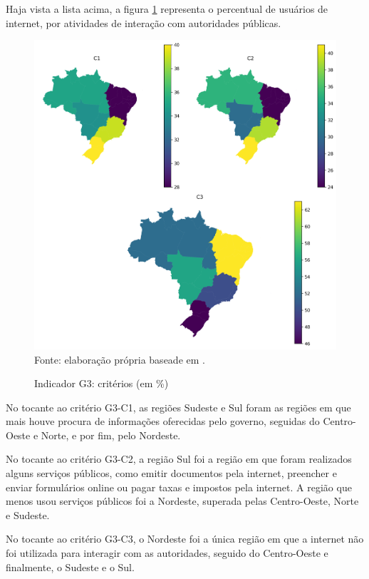 Haja vista a lista acima, a figura \ref{fig:mapa_coropletico_tic_domicilios_2024_g3}  representa o percentual de usuários de internet, por atividades de interação com autoridades públicas. 

\begin{figure}[H]
	\centering
	\caption{Indicador G3: critérios (em \%)}
	\includegraphics[width=1\linewidth]{figuras/mapa_coropletico_tic_domicilios_2024_g3.png}
	\label{fig:mapa_coropletico_tic_domicilios_2024_g3}
	\footnotesize{Fonte: elaboração própria baseade em \cite{tic_domicilios_2024_g3}.}
\end{figure}

No tocante ao critério G3-C1, as regiões Sudeste e Sul foram as regiões em que mais houve procura de informações oferecidas pelo governo, seguidas do Centro-Oeste e Norte, e por fim, pelo Nordeste.

No tocante ao critério G3-C2, a região Sul foi a região em que foram realizados alguns serviços públicos, como emitir documentos pela internet, preencher e enviar formulários online ou pagar taxas e impostos pela internet. A região que menos usou serviços públicos foi a Nordeste, superada pelas Centro-Oeste, Norte e Sudeste.

No tocante ao critério G3-C3, o Nordeste foi a única região em que a internet não foi utilizada para interagir com as autoridades, seguido do Centro-Oeste e finalmente, o Sudeste e o Sul.

